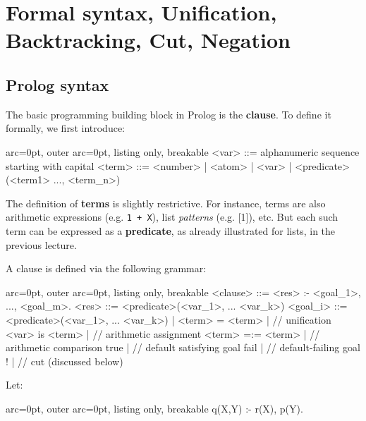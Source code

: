 \section*{ Formal syntax, Unification, Backtracking, Cut, Negation }

\subsection*{ Prolog syntax }

The basic programming building block in Prolog is the \textbf{clause}. To define it formally, we first introduce:


\begin{tcblisting}{ arc=0pt, outer arc=0pt, listing only, breakable}
<var> ::= alphanumeric sequence starting with capital
<term> ::= <number> | <atom> | <var> | <predicate>(<term1> ..., <term_n>)  

\end{tcblisting}


The definition of \textbf{terms} is slightly restrictive. For instance, terms are also arithmetic expressions (e.g. \texttt{1 + X}), list \textit{patterns} (e.g. [1\textbar[]]), etc. But each such term can be expressed as a \textbf{predicate}, as already illustrated for lists, in the previous lecture.

A clause is defined via the following grammar:


\begin{tcblisting}{ arc=0pt, outer arc=0pt, listing only, breakable}
<clause> ::= <res> :- <goal_1>, ..., <goal_m>.
<res> ::= <predicate>(<var_1>, ... <var_k>)
<goal_i> ::= <predicate>(<var_1>, ... <var_k>) |
             <term> = <term> |                     // unification
             <var> is <term> |                     // arithmetic assignment
             <term> =:= <term> |                   // arithmetic comparison
             true |                                // default satisfying goal
             fail |                                // default-failing goal
             ! |                                   // cut (discussed below)

\end{tcblisting}


Let:

\begin{tcblisting}{ arc=0pt, outer arc=0pt, listing only, breakable}
q(X,Y) :- r(X), p(Y).

\end{tcblisting}


